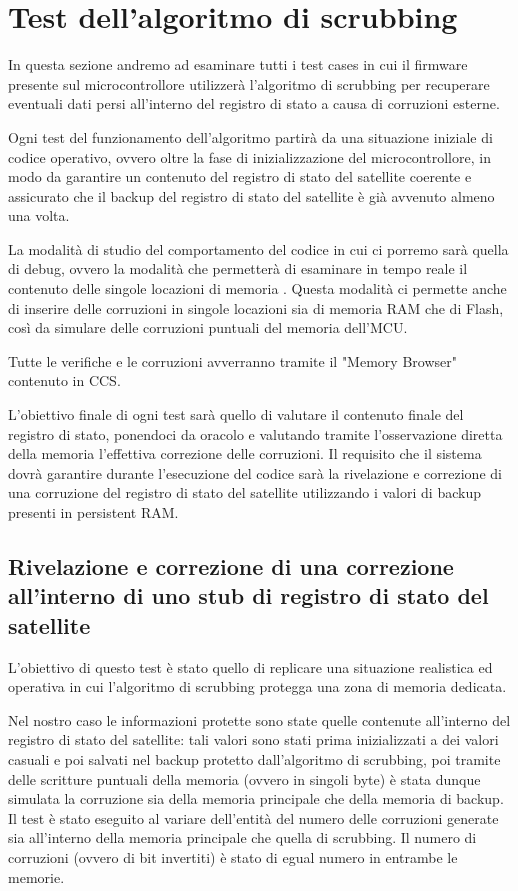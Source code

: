 \documentclass[LaM,binding=0.6cm]{../sapthesis}
\begin{document}
\section{Test dell'algoritmo di scrubbing}

In questa sezione andremo ad esaminare tutti i test cases in cui il firmware presente sul microcontrollore utilizzerà l'algoritmo di scrubbing per recuperare eventuali dati persi all'interno del registro di stato a causa di corruzioni esterne.

Ogni test del funzionamento dell'algoritmo partirà da una situazione iniziale di codice operativo, ovvero oltre la fase di inizializzazione del microcontrollore, in modo da garantire un contenuto del registro di stato del satellite coerente e assicurato che il backup del registro di stato del satellite è già avvenuto almeno una volta.

La modalità di studio del comportamento del codice in cui ci porremo sarà quella di debug, ovvero la modalità che permetterà di esaminare in tempo reale il contenuto delle singole locazioni di memoria .
Questa modalità ci permette anche di inserire delle corruzioni in singole locazioni sia di memoria RAM che di Flash, così da simulare delle corruzioni puntuali del memoria dell'MCU.

Tutte le verifiche e le corruzioni avverranno tramite il "Memory Browser" contenuto in CCS.

L'obiettivo finale di ogni test sarà quello di valutare il contenuto finale del registro di stato, ponendoci da oracolo e valutando tramite l'osservazione diretta della memoria l'effettiva correzione delle corruzioni.\newline\newline
Il requisito che il sistema dovrà garantire durante l'esecuzione del codice sarà la rivelazione e correzione di una corruzione del registro di stato del satellite utilizzando i valori di backup presenti in persistent RAM.

\subsection{Rivelazione e correzione di una correzione all'interno di uno stub di registro di stato del satellite}

L'obiettivo di questo test è stato quello di replicare una situazione realistica ed operativa in cui l'algoritmo di scrubbing protegga una zona di memoria dedicata. 

Nel nostro caso le informazioni protette sono state quelle contenute all'interno del registro di stato del satellite: tali valori sono stati prima inizializzati a dei valori casuali e poi salvati nel backup protetto dall'algoritmo di scrubbing, poi tramite delle scritture puntuali della memoria (ovvero in singoli byte) è stata dunque simulata la corruzione sia della memoria principale che della memoria di backup. \newline\newline
Il test è stato eseguito al variare dell'entità del numero delle corruzioni generate sia all'interno della memoria principale che quella di scrubbing. Il numero di corruzioni (ovvero di bit invertiti) è stato di egual numero in entrambe le memorie.
\end{document}
